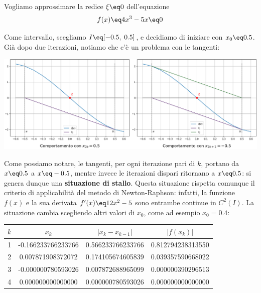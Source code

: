 \begin{example}
    Vogliamo approssimare la redice $\xi \eq 0$ dell'equazione
    \[ f(x) \eq 4x^3 - 5x \eq 0 \]

    Come intervallo, scegliamo $I \eq [-0.5, \; 0.5]$, e decidiamo di iniziare con $x_0 \eq 0.5$. Già dopo due iterazioni, notiamo che c'è un problema con le tangenti:
    \begin{center}
        \includegraphics[width=\linewidth]{assets/image-005.png}
    \end{center}

    Come possiamo notare, le tangenti, per ogni iterazione pari di $k$, portano da $x \eq 0.5$ a $x \eq -0.5$, mentre invece le iterazioni dispari ritornano a $x \eq 0.5$: si genera dunque una \textbf{situazione di stallo}. Questa situazione rispetta comunque il criterio di applicabilità del metodo di Newton-Raphson: infatti, la funzione $f(x)$ e la sua derivata $f'(x) \eq 12x^2 - 5$ sono entrambe continue in $C^2 (I)$. La situazione cambia scegliendo altri valori di $x_0$, come ad esempio $x_0 = 0.4$:

    \begin{center}
        \begin{tabular}{|c|c|c|c|}
            \hline
            $k$ & $x_k$ & $|x_k - x_{k - 1}|$ & $\left\lvert f(x_k) \right\rvert$ \\
            \hline\hline
            1 & -0.166233766233766 & 0.566233766233766 & 0.812794238313550 \\
            \hline
            2 & 0.007871908372072 & 0.174105674605839 & 0.039357590668022 \\
            \hline
            3 & -0.000000780593026 & 0.007872688965099 & 0.000000390296513 \\
            \hline
            4 & 0.000000000000000 & 0.000000780593026 & 0.000000000000000 \\
            \hline
        \end{tabular}
    \end{center}
\end{example}

